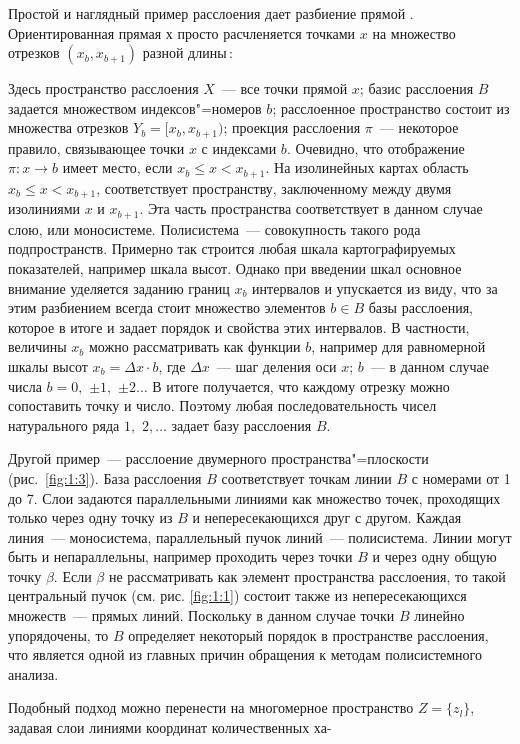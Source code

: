 \documentclass[14pt,draft,openany]{extbook}
\begin{document}
Простой и наглядный пример расслоения дает разбиение прямой \cite{b136}. Ориентированная прямая х просто расчленяется точками $x$ на множество отрезков $(x_b, x_{b+1})$ разной длины\,:


\noindent{}Здесь пространство расслоения $X$~--- все точки прямой $x$; базис расслоения $B$ задается множеством индексов"=номеров $b$; расслоенное пространство состоит из множества отрезков $Y_b = [x_b, x_{b+1})$; проекция расслоения $\pi{}$~--- некоторое правило, связывающее точки $x$ с индексами $b$. Очевидно, что отображение $\pi{}: x\to{} b$ имеет место, если $x_b \leqslant{} x < x_{b+1}$. На изолинейных картах область $x_b \leqslant{} x < x_{b+1}$, соответствует пространству, заключенному между двумя изолиниями $x$ и $x_{b+1}$. Эта часть пространства соответствует в данном случае слою, или моносистеме. Полисистема~--- совокупность такого рода подпространств. Примерно так строится любая шкала картографируемых показателей, например шкала высот. Однако при введении шкал основное внимание уделяется заданию границ $x_b$ интервалов и упускается из виду, что за этим разбиением всегда стоит множество элементов $b\in{}B$ базы расслоения, которое в итоге и задает порядок и свойства этих интервалов. В частности, величины $x_b$ можно рассматривать как функции $b$, например для равномерной шкалы высот $x_b=\Delta{}x\cdot{} b$, где $\Delta{}x$~--- шаг деления оси $x$; $b$~--- в данном случае числа $b=0,$ $\pm{}1,$ $\pm{}2\ldots{}$ В итоге получается, что каждому отрезку можно сопоставить точку и число. Поэтому любая последовательность чисел натурального ряда $1,$ $2,\ldots{}$ задает базу расслоения $B$.



Другой пример~--- расслоение двумерного пространства"=плоскости (рис.~\ref{fig:1:3}). База расслоения $B$ соответствует точкам линии $B$ с номерами от 1 до 7. Слои задаются параллельными линиями как множество точек, проходящих только через одну точку из $B$ и непересекающихся друг с другом. Каждая линия~--- моносистема, параллельный пучок линий~--- полисистема. Линии могут быть и непараллельны, например проходить через точки $B$ и через одну общую точку $\beta$. Если $\beta{}$ не рассматривать как элемент пространства расслоения, то такой центральный пучок (см. рис. \ref{fig:1:1}) состоит также из непересекающихся множеств~--- прямых линий. Поскольку в данном случае точки $B$ линейно упорядочены, то $B$ определяет некоторый порядок в пространстве расслоения, что является одной из главных причин обращения к методам полисистемного анализа.

Подобный подход можно перенести на многомерное пространство $Z=\{z_l\}$, задавая слои линиями координат количественных ха-

\end{document}
